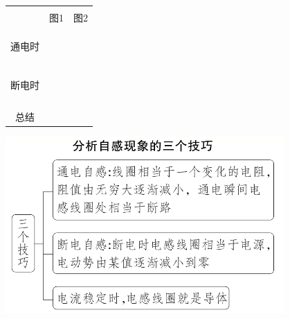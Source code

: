 \documentclass{article}
\begin{document}
\vspace{2em}

\begin{tabular}{|p{}|p{}|p{}|}
    \hline
    \multicolumn{1}{|c|}{}    &                &                \\
    \multicolumn{1}{|c|}{}    & \hspace{7em}图1 & \hspace{7em}图2 \\
    \multicolumn{1}{|c|}{}    &                &                \\
    \hline

    \multicolumn{1}{|c|}{}    &                &                \\
    \multicolumn{1}{|c|}{}    &                &                \\
    \multicolumn{1}{|c|}{通电时} &                &                \\
    \multicolumn{1}{|c|}{}    &                &                \\
    \multicolumn{1}{|c|}{}    &                &                \\
    \hline
    \multicolumn{1}{|c|}{}    &                &                \\
    \multicolumn{1}{|c|}{}    &                &                \\
    \multicolumn{1}{|c|}{}    &                &                \\
    \multicolumn{1}{|c|}{}    &                &                \\
    \multicolumn{1}{|c|}{断电时} &                &                \\
    \multicolumn{1}{|c|}{}    &                &                \\
    \multicolumn{1}{|c|}{}    &                &                \\
    \multicolumn{1}{|c|}{}    &                &                \\
    \multicolumn{1}{|c|}{}    &                &                \\
    \hline
    \multicolumn{1}{|c|}{总结}  &
    \multicolumn{2}{|c|}{}                                      \\
    \hline
\end{tabular}

\vspace{2em}

\includegraphics[width = 0.8\textwidth]{pictures/3.png}
\end{document}
